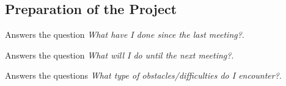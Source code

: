 \subsection{Preparation of the Project}

Answers the question \emph{What have I done since the last meeting?}.

Answers the question \emph{What will I do until the next meeting?}.

Answers the questions \emph{What type of obstacles/difficulties do I encounter?}.

